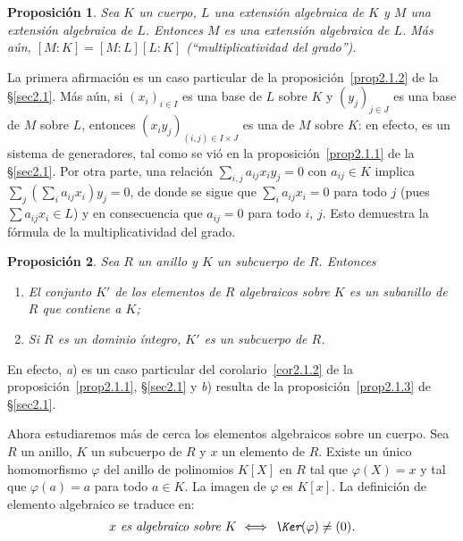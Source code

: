 \documentclass[bibtotoc,leqno,spanish]{amsbook}
\let\emph\relax %
\numberwithin{equation}{section}
\theoremstyle{note}
\theoremstyle{note}
\newtheorem{proposition}{Proposici\'on}
\theoremstyle{rem}
\numberwithin{theorem}{section}
\numberwithin{proposition}{section}
\numberwithin{definition}{section}
\numberwithin{lemma}{section}
\numberwithin{corollary}{section}
\numberwithin{example}{section}
\numberwithin{footnote}{section}%
\begin{document}
\begin{proposition}\label{prop2.3.1}
Sea $K$ un cuerpo, $L$ una extensi\'on algebraica de $K$ y $M$ una extensi\'on algebraica de $L$. Entonces
$M$ es una extensi\'on algebraica de $L$. M\'as a\'un, $[M:K] = [M:L][L:K]$
(``multiplicatividad del grado'').
\end{proposition}

La primera afirmaci\'on es un caso particular de la proposici\'on~\ref{prop2.1.2} de la \S\ref{sec2.1}.
M\'as a\'un, si $(x_{i})_{i\in I}$
es una base de $L$ sobre $K$ y $(y_{j})_{j\in J}$ es una base de $M$ sobre $L$, entonces $(x_{i}y_{j})_{(i,j)\in I\times J}$
es una \emph{base} de $M$ sobre $K$: en efecto, es un sistema de generadores, tal como se vi\'o en la
proposici\'on~\ref{prop2.1.1} de la \S\ref{sec2.1}.
Por otra parte, una relaci\'on $\sum_{i,j}a_{ij}x_{i}y_{j} = 0$ con $a_{ij}\in K$ implica
$\sum_{j}\left(\sum_{i}a_{ij}x_{i}\right)y_{j} = 0$, de donde se sigue que
$\sum_{i}a_{ij}x_{i} = 0$ para todo $j$ (pues
$\sum a_{ij}x_{i}\in L$) y en consecuencia que $a_{ij} = 0$ para todo $i$, $j$. Esto demuestra la f\'ormula
de la multiplicatividad del grado.

\begin{proposition}
Sea $R$ un anillo y $K$ un subcuerpo de $R$. Entonces
\begin{enumerate}
\item[\upshape a)] El conjunto $K'$ de los elementos de $R$ algebraicos sobre $K$ es un subanillo de $R$ que contiene a $K$;
\item[\upshape b)] Si $R$ es un dominio \'integro, $K'$ es un subcuerpo de $R$.
\end{enumerate}
\end{proposition}

En efecto, {\itshape a}) es un caso particular del corolario~\ref{cor2.1.2} de la proposici\'on~\ref{prop2.1.1}, \S\ref{sec2.1}
y {\itshape b}) resulta de la proposici\'on~\ref{prop2.1.3} de \S\ref{sec2.1}.

Ahora estudiaremos m\'as de cerca los elementos algebraicos sobre un cuerpo. Sea $R$ un anillo, $K$ un subcuerpo
de $R$ y $x$ un elemento de $R$. Existe un \'unico homomorfismo $\varphi$ del anillo de polinomios $K[X]$ en
$R$ tal que $\varphi(X) = x$ y tal que $\varphi(a) = a$ para todo $a\in K$. La imagen de $\varphi$ es $K[x]$.
La definici\'on de elemento algebraico se traduce en:
\begin{gather}\label{eq-2.3-4}
\text{\itshape $x$ es algebraico sobre $K$ $\iff$ $\Ker(\varphi)\neq(0)$.}
\end{gather}
\end{document}
